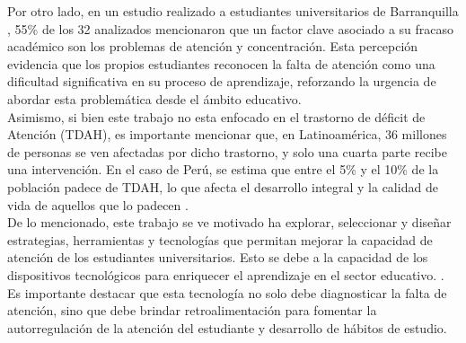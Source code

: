 Por otro lado, en un estudio realizado a estudiantes universitarios de Barranquilla \autocite{contreras}, 55\% de los 32 analizados mencionaron que un factor clave asociado a su fracaso académico son los problemas de atención y concentración. Esta percepción evidencia que los propios estudiantes reconocen la falta de atención como una dificultad significativa en su proceso de aprendizaje, reforzando la urgencia de abordar esta problemática desde el ámbito educativo.\\

	Asimismo, si bien este trabajo no esta enfocado en el trastorno de déficit de Atención (TDAH), es importante mencionar que, en Latinoamérica, 36 millones de personas se ven afectadas por dicho trastorno, y solo una cuarta parte recibe una intervención. En el caso de Perú, se estima que entre el 5\% y el 10\% de la población padece de TDAH, lo que afecta el desarrollo integral y la calidad de vida de aquellos que lo padecen \autocite{davila2023trastorno}. \\
    
De lo mencionado, este trabajo se ve motivado ha explorar, seleccionar y diseñar estrategias, herramientas y tecnologías que permitan mejorar la capacidad de atención de los estudiantes universitarios. Esto se debe a la capacidad de los dispositivos tecnológicos para enriquecer el aprendizaje en el sector educativo. \autocite{wearable}. Es importante destacar que esta tecnología no solo debe diagnosticar la falta de atención, sino que debe brindar retroalimentación para fomentar la autorregulación de la atención del estudiante y desarrollo de hábitos de estudio.


 
    

